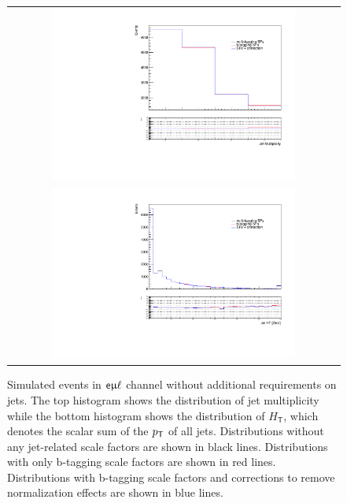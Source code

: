  \begin{figure}[tbh!]
 \begin{center}
 \begin{tabular}{c}
 \includegraphics[width=0.75\textwidth]{figures/Part3/Objects/njet_Btag}\\
 \includegraphics[width=0.75\textwidth]{figures/Part3/Objects/Ht_Btag} \\
 \end{tabular}
 \caption{Simulated events in $\textsf{e}\upmu\ell$ channel without additional requirements on jets. The top histogram shows the distribution of jet multiplicity while the bottom histogram shows the distribution of $H_\textsf{T}$, which denotes the scalar sum of the $p_{\textsf{T}}$ of all jets. Distributions without any jet-related scale factors are shown in black lines. Distributions with only b-tagging scale factors are shown in red lines. Distributions with b-tagging scale factors and corrections to remove normalization effects are shown in blue lines.}
 \label{fig:BtagSF}
 \end{center}
\end{figure}
